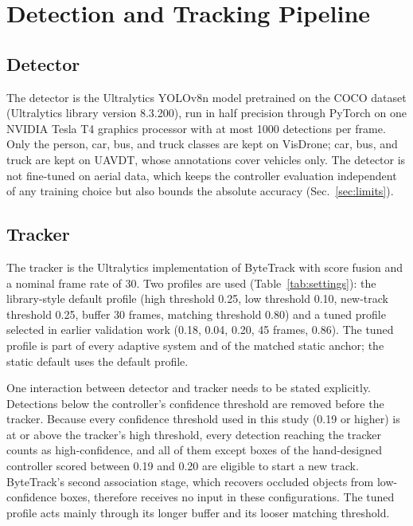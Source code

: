 \documentclass[journal]{new-aiaa}
\begin{document}
\section{Detection and Tracking Pipeline}\label{sec:pipeline}

\subsection{Detector}
The detector is the Ultralytics YOLOv8n model pretrained on the COCO dataset (Ultralytics library version 8.3.200), run in half precision through PyTorch on one NVIDIA Tesla T4 graphics processor with at most 1000 detections per frame. Only the person, car, bus, and truck classes are kept on VisDrone; car, bus, and truck are kept on UAVDT, whose annotations cover vehicles only. The detector is not fine-tuned on aerial data, which keeps the controller evaluation independent of any training choice but also bounds the absolute accuracy (Sec.~\ref{sec:limits}).

\subsection{Tracker}
The tracker is the Ultralytics implementation of ByteTrack \cite{zhang2022bytetrack} with score fusion and a nominal frame rate of 30. Two profiles are used (Table~\ref{tab:settings}): the library-style default profile (high threshold 0.25, low threshold 0.10, new-track threshold 0.25, buffer 30 frames, matching threshold 0.80) and a tuned profile selected in earlier validation work (0.18, 0.04, 0.20, 45 frames, 0.86). The tuned profile is part of every adaptive system and of the matched static anchor; the static default uses the default profile.

One interaction between detector and tracker needs to be stated explicitly. Detections below the controller's confidence threshold are removed before the tracker. Because every confidence threshold used in this study (0.19 or higher) is at or above the tracker's high threshold, every detection reaching the tracker counts as high-confidence, and all of them except boxes of the hand-designed controller scored between 0.19 and 0.20 are eligible to start a new track. ByteTrack's second association stage, which recovers occluded objects from low-confidence boxes, therefore receives no input in these configurations. The tuned profile acts mainly through its longer buffer and its looser matching threshold.
\end{document}
